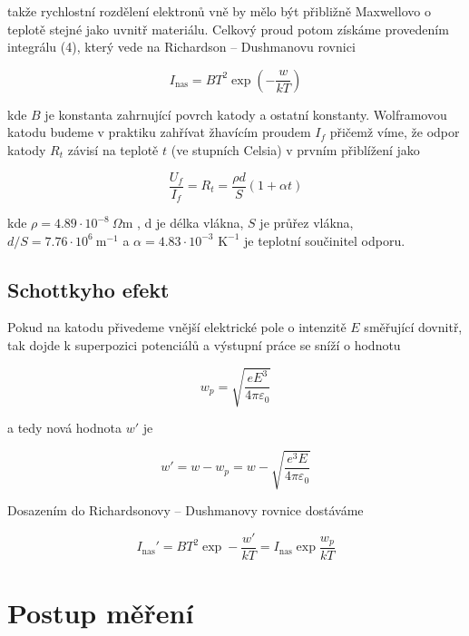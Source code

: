 \documentclass[a4paper,11pt]{article}
\begin{document}
\noindent
takže rychlostní rozdělení elektronů vně by mělo být přibližně Maxwellovo o teplotě stejné jako uvnitř materiálu. Celkový proud potom získáme provedením integrálu (4), který vede na Richardson – Dushmanovu rovnici

\begin{equation}
I_{\text{nas}} = B T^2 \exp\left(- \frac{w}{kT} \right)
\end{equation}

\noindent
kde $ B $ je konstanta zahrnující povrch katody a ostatní konstanty. Wolframovou katodu budeme v praktiku zahřívat žhavícím proudem $ I_{f} $ přičemž víme, že odpor katody $ R_t $ závisí na teplotě $ t $ (ve stupních Celsia) v prvním přiblížení jako

\begin{equation}
\frac{U_f}{I_f} = R_t = \frac{\rho d}{ S} (1 + \alpha t)
\end{equation}

\noindent
kde $ \rho = 4.89 \cdot 10^{-8} \ \Omega  $m , d je délka vlákna, $ S $ je průřez vlákna, $ d / S = 7.76 \cdot 10^{6} \ \text{m}^{-1} $ a $ \alpha = 4.83 \cdot 10 ^{-3} \text{ K}^{-1} $ je teplotní součinitel odporu.

\subsection{Schottkyho efekt}

Pokud na katodu přivedeme vnější elektrické pole o intenzitě $ E $ směřující dovnitř, tak dojde k superpozici potenciálů a výstupní práce se sníží o hodnotu

\begin{equation}
 w_p = \sqrt{ \frac{e E^{3}}{4 \pi \varepsilon_0}}
\end{equation}

\noindent
a tedy nová hodnota $w'$ je

\begin{equation}
w' = w - w_p = w - \sqrt{ \frac{e^{3} E}{4 \pi \varepsilon_0}}
\end{equation}

\noindent
Dosazením do Richardsonovy – Dushmanovy rovnice dostáváme

\begin{equation}
    I_{\text{nas}}' = BT^2 \exp - \frac{w'}{kT}  = I_{\text{nas}} \exp \frac{w_p}{kT}
\end{equation}

 
\section{Postup měření}
\end{document}
